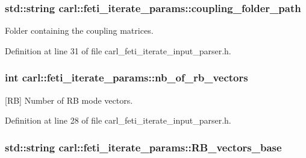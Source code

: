 \subsubsection[{coupling\+\_\+folder\+\_\+path}]{\setlength{\rightskip}{0pt plus 5cm}std\+::string carl\+::feti\+\_\+iterate\+\_\+params\+::coupling\+\_\+folder\+\_\+path}\label{structcarl_1_1feti__iterate__params_a198b85f203c17fa0f5973f9c2ced2110}


Folder containing the coupling matrices. 



Definition at line 31 of file carl\+\_\+feti\+\_\+iterate\+\_\+input\+\_\+parser.\+h.

\hypertarget{structcarl_1_1feti__iterate__params_a5565d7f7666b2417af811d423e37d270}{}
\subsubsection[{nb\+\_\+of\+\_\+rb\+\_\+vectors}]{\setlength{\rightskip}{0pt plus 5cm}int carl\+::feti\+\_\+iterate\+\_\+params\+::nb\+\_\+of\+\_\+rb\+\_\+vectors}\label{structcarl_1_1feti__iterate__params_a5565d7f7666b2417af811d423e37d270}


\mbox{[}R\+B\mbox{]} Number of R\+B mode vectors. 



Definition at line 28 of file carl\+\_\+feti\+\_\+iterate\+\_\+input\+\_\+parser.\+h.

\hypertarget{structcarl_1_1feti__iterate__params_aa1d86f53ac7316537089cda134f7dd00}{}
\subsubsection[{R\+B\+\_\+vectors\+\_\+base}]{\setlength{\rightskip}{0pt plus 5cm}std\+::string carl\+::feti\+\_\+iterate\+\_\+params\+::\+R\+B\+\_\+vectors\+\_\+base}\label{structcarl_1_1feti__iterate__params_aa1d86f53ac7316537089cda134f7dd00}


